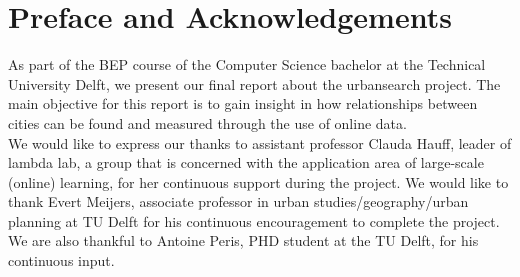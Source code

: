 \chapter*{Preface and Acknowledgements}
As part of the BEP course of the Computer Science bachelor at the Technical University Delft, we present our final report about the urbansearch project. The main objective for this report is to gain insight in how relationships between cities can be found and measured through the use of online data.\\

We would like to express our thanks to assistant professor Clauda Hauff, leader of lambda lab, a group that is concerned with the application area of large-scale (online) learning, for her continuous support during the project. We would like to thank Evert Meijers, associate professor in urban studies/geography/urban planning at TU Delft for his continuous encouragement to complete the project. We are also thankful to Antoine Peris, PHD student at the TU Delft, for his continuous input.
